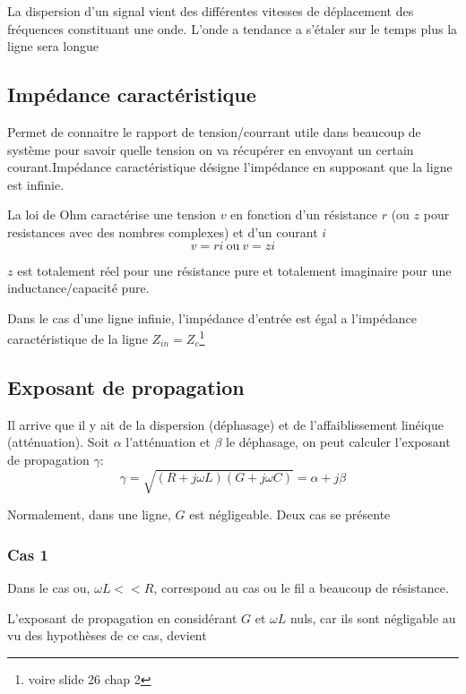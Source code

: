 		La dispersion d'un signal vient des différentes vitesses de déplacement des fréquences constituant une onde. L'onde a tendance a s'étaler sur le temps plus la ligne sera longue
		
	\subsection{Impédance caractéristique}
		Permet de connaitre le rapport de tension/courrant utile dans beaucoup de système pour savoir quelle tension on va récupérer en envoyant un certain courant.Impédance caractéristique désigne l'impédance en supposant que la ligne est infinie.
		
		La loi de Ohm caractérise une tension $v$ en fonction d'un résistance $r$ (ou $z$ pour resistances avec des nombres complexes) et d'un courant $i$
		\begin{equation}
			v = ri\  \text{ou} \  v = zi
		\end{equation}
		
		$z$ est totalement réel pour une résistance pure et totalement imaginaire pour une inductance/capacité pure.
		
		Dans le cas d'une ligne infinie, l'impédance d'entrée est égal a l'impédance caractéristique de la ligne $Z_{in} = Z_c$\footnote{voire slide 26 chap 2}
		
	\subsection{Exposant de propagation}
		Il arrive que il y ait de la dispersion (déphasage) et de l'affaiblissement linéique (atténuation). Soit $\alpha$ l'atténuation et $\beta$ le déphasage, on peut calculer l'exposant de propagation $\gamma$:
		\begin{equation}
			\gamma = \sqrt{(R + j \omega L)(G + j \omega C)} = \alpha + j \beta
		\end{equation}
		
		Normalement, dans une ligne, $G$ est négligeable. Deux cas se présente 
		
		\subsubsection{Cas 1}
			Dans le cas ou, $\omega L << R$, correspond au cas ou le fil a beaucoup de résistance.
			
			L'exposant de propagation en considérant $G$ et $\omega L$ nuls, car ils sont négligable au vu des hypothèses de ce cas, devient
			
